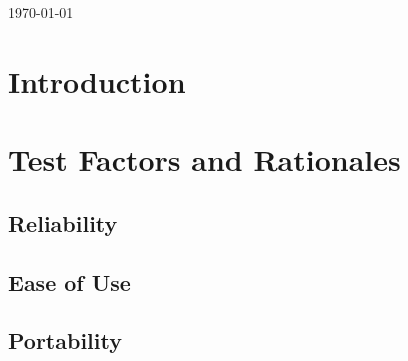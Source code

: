 \documentclass[paper=letter, fontsize=10pt]{scrartcl}
\numberwithin{equation}{section}		%
\numberwithin{figure}{section}			%
\numberwithin{table}{section}				%
\begin{document}
\begin{titlepage}
\begin{center}


{\large \today}\\[3cm] %


 

\vfill %
\end{center}
\end{titlepage}

\setcounter{tocdepth}{2}

\tableofcontents

\newpage
\section{Introduction}

\section{Test Factors and Rationales}
\subsection{Reliability}
\subsection{Ease of Use}
\subsection{Portability}
\end{document}
